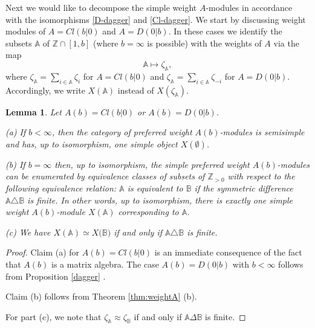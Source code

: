 \documentclass[12pt]{amsart}
\makeatletter
\def\@putname#1#2#3#4{\def\@@ref{#3}\let\old@bf\bf
        \def\bf##1{\old@bf\if?\noexpand##1?{#4}\else##1\fi}%
	#1{#2}%
        \let\bf\old@bf}
\def\@putname#1#2#3#4{\def\@@ref{#3}\let\old@bf\bf	%
	\let\old@reset@font\reset@font			%
        \def\bf##1{\old@bf\if?\noexpand##1?{#4}\else##1\fi}%
	\def\reset@font##1##2{\old@reset@font##1\if?\noexpand##2?{#4}\else##2\fi}#1{#2}%
        \let\bf\old@bf\let\reset@font\old@reset@font}
\let\my@ref=\ref
\def\ref#1{\@putname\my@ref{#1}{#1}{\tiny\rm\@@ref}}
\theoremstyle{plain} %
\numberwithin{equation}{section}
\theoremstyle{definition}
\theoremstyle{remark}
\theoremstyle{plain} %
\newtheorem{lemma}[definition]{Lemma}
\makeatother
\begin{document}
        
        
Next we would like to decompose the simple weight $A$-modules in accordance with the isomorphisms \eqref{D-dagger} and \eqref{Cl-dagger}. We start by discussing  weight modules of $A = Cl(b|0)$ and $A = D(0|b)$. In these cases we identify the  subsets $\mathbb A$ of $\mathbb Z \cap [1,b]$ (where $b=\infty$ is possible)  with the weights of $A$ via the map  $$\mathbb A \mapsto  \zeta_{\mathbb A},$$ where $\zeta_{\mathbb A} = \sum_{i \in \mathbb A} \zeta_i$ for $A = Cl(b|0)$ and $\zeta_{\mathbb A} = \sum_{i \in \mathbb A} \zeta_{-i}$ for $A = D(0|b)$. Accordingly, we  write $X(\mathbb A)$ instead of $X(\zeta_{\mathbb A})$. 

        \begin{lemma} \label{Clifford}   Let $A (b) = Cl(b|0)$ or $ A (b) = D(0|b)$. 
          
          (a) If $b < \infty$, then the category of preferred weight $ A (b)$-modules is semisimple and has,  up to isomorphism,  one simple object $X({\emptyset})$.

          
          (b)   If $b  = \infty$ then, up to isomorphism,  the simple preferred weight $ A (b)$-modules can be enumerated by equivalence
          classes of subsets of $\mathbb{Z}_{> 0}$ with respect  to the following equivalence relation: $\mathbb A$ is equivalent to $\mathbb B$ if the symmetric
          difference $\mathbb A\triangle \mathbb B$ is finite. In other words, up to isomorphism, there is exactly one simple weight $A(b)$-module $X ({\mathbb A})$ corresponding to ${\mathbb A}$. 
          
         (c)  We have 
           $X({\mathbb A}) \simeq X({\mathbb B)}$ if and only if $\mathbb A\triangle \mathbb B$ is finite.
          
        \end{lemma}
        \begin{proof} Claim (a) for  $ A (b) = Cl(b|0)$ is an immediate consequence of the fact that $ A (b)$  is a matrix algebra. The case  $ A (b) = D(0|b)$ with  $b < \infty$ follows from Proposition \ref{dagger}. 
        
        
         Claim (b)  follows from Theorem \ref{thm:weightA}(b).

For part (c), we note that 
$\zeta_{\mathbb A} \approx \zeta_{\mathbb B} $ if and only if $\mathbb A  \Delta \mathbb B $ is finite. 
                  \end{proof}

 
\end{document}
